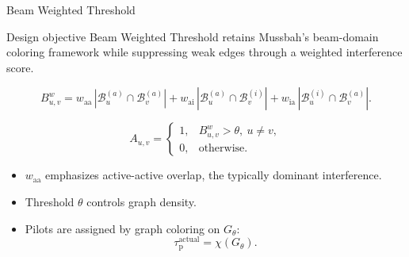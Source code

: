 \documentclass[10pt,aspectratio=169]{beamer}
\newcommand{\tauactual}{\tau_{\mathrm{p}}^{\mathrm{actual}}}
\newcommand{\BWT}{Beam Weighted Threshold}
\newcommand{\waa}{w_{\mathrm{aa}}}
\newcommand{\wai}{w_{\mathrm{ai}}}
\newcommand{\wia}{w_{\mathrm{ia}}}
\newenvironment{tightitemize}{%
    \begin{itemize}
        \setlength{\itemsep}{2pt}
        \setlength{\parskip}{0pt}
        \setlength{\parsep}{0pt}
}{%
    \end{itemize}
}
\begin{document}
\begin{frame}{Beam Weighted Threshold}
    \small
    \begin{block}{Design objective}
        \BWT{} retains Mussbah's beam-domain coloring framework while suppressing weak edges through a weighted interference score.
    \end{block}
    
    \vspace{0.4em}
    \[
        B_{u,v}^{w}
        =
        \waa\,|\mathcal{B}_{u}^{(a)}\cap\mathcal{B}_{v}^{(a)}|
        +
        \wai\,|\mathcal{B}_{u}^{(a)}\cap\mathcal{B}_{v}^{(i)}|
        +
        \wia\,|\mathcal{B}_{u}^{(i)}\cap\mathcal{B}_{v}^{(a)}|.
    \]
    
    \[
        A_{u,v}
        =
        \begin{cases}
            1, & B_{u,v}^{w}>\theta,\ u\neq v, \\
            0, & \text{otherwise.}
        \end{cases}
    \]
    
    \vspace{0.3em}
    \begin{tightitemize}
        \item \(\waa\) emphasizes active-active overlap, the typically dominant interference.
        \item Threshold \(\theta\) controls graph density.
        \item Pilots are assigned by graph coloring on \(G_{\theta}\):
        \[
            \tauactual = \chi(G_{\theta}).
        \]
    \end{tightitemize}
\end{frame}
\end{document}
